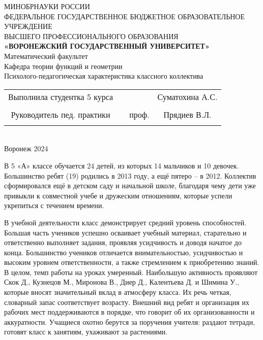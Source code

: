 \documentclass[a4paper,12pt]{article}
\begin{document}
\begin{center}
	\hfill \break
	\large{МИНОБРНАУКИ РОССИИ}\\
	\footnotesize{ФЕДЕРАЛЬНОЕ ГОСУДАРСТВЕННОЕ БЮДЖЕТНОЕ ОБРАЗОВАТЕЛЬНОЕ УЧРЕЖДЕНИЕ}\\
	\footnotesize{ВЫСШЕГО ПРОФЕССИОНАЛЬНОГО ОБРАЗОВАНИЯ}\\
	\small{\textbf{«ВОРОНЕЖСКИЙ ГОСУДАРСТВЕННЫЙ УНИВЕРСИТЕТ»}}\\
	\hfill \break
	\normalsize{Математический факультет}\\
	\hfill \break
	\normalsize{Кафедра теории функций и геометрии}\\
	\hfill\break
	\hfill \break
	\hfill \break
	\hfill \break
	\hfill \break
	\hfill \break
	\hfill \break
	\hfill \break
	\hfill \break
	\large{Психолого-педагогическая характеристика классного коллектива	}\\
	\hfill \break
	\hfill \break
	\hfill \break
\hfill \break
\hfill \break
\hfill \break
\hfill \break
\hfill \break
\hfill \break
\normalsize{
	\begin{tabular}{cccc}
		Выполнила студентка 5 курса & \underline{\hspace{3cm}} &                       &  Суматохина А.С. \\\\
		Руководитель пед. практики & \underline{\hspace{3cm}} & проф. & Прядиев В.Л.    \\\\
	\end{tabular}
}\\
\hfill \break
\hfill \break
\hfill \break
\hfill \break
\hfill \break
\hfill \break
\hfill \break
\hfill \break
\hfill \break
\hfill \break
\hfill \break
\hfill \break
\hfill \break
\hfill \break
\hfill \break
\hfill \break
\hfill \break
Воронеж 2024 \end{center}
\newpage

В 5 «А» классе обучается 24 детей, из которых 14 мальчиков и 10 девочек. Большинство ребят (19) родились в 2013 году, а ещё пятеро – в 2012. Коллектив сформировался ещё в детском саду и начальной школе, благодаря чему дети уже привыкли к совместной учебе и дружеским отношениям, которые успели укрепиться с течением времени.

В учебной деятельности класс демонстрирует средний уровень способностей. Большая часть учеников успешно осваивает учебный материал, старательно и ответственно выполняет задания, проявляя усидчивость и доводя начатое до конца. Большинство учеников отличается внимательностью, усидчивостью и высоким уровнем ответственности, а также стремлением к приобретению знаний. В целом, темп работы на уроках умеренный. Наибольшую активность проявляют Скок Д., Кузнецов М., Миронова В., Диер Д., Калентьева Д. и Шимина У., которые вносят значительный вклад в атмосферу класса. Их речь четкая, словарный запас соответствует возрасту. Внешний вид ребят и организация их рабочих мест поддерживаются в порядке, что говорит об их организованности и аккуратности. Учащиеся охотно берутся за поручения учителя: раздают тетради, готовят класс к занятиям, ухаживают за растениями.
\end{document}

